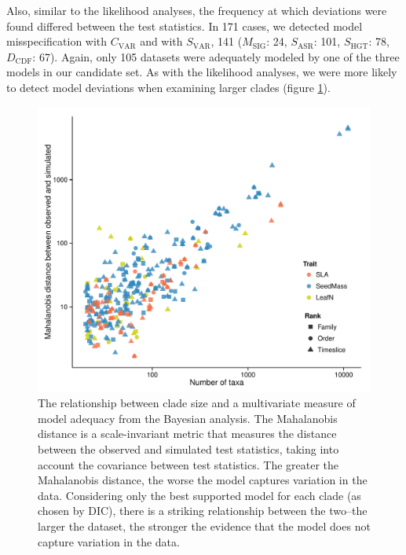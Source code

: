 Also, similar to the likelihood analyses, the frequency at which deviations were found differed between the test statistics. In 171 cases, we detected model misspecification with $C_{\text{VAR}}$ and with $S_{\text{VAR}}$, 141 ($M_{\text{SIG}}$: 24, $S_{\text{ASR}}$: 101, $S_{\text{HGT}}$: 78, $D_{\text{CDF}}$: 67). Again, only 105 datasets were adequately modeled by one of the three models in our candidate set. As with the likelihood analyses, we were more likely to detect model deviations when examining larger clades (figure \ref{fig:supp-size-adequacy}).

\begin{figure}[p]
  \centering
  \includegraphics[width=\textwidth]{figs/ad-size-bayes}
  \caption[Model adequacy vs. clade size (Bayesian)]{The relationship between clade size and a multivariate measure of model adequacy from the Bayesian analysis. The Mahalanobis distance is a scale-invariant metric that measures the distance between the observed and simulated test statistics, taking into account the covariance between test statistics. The greater the Mahalanobis distance, the worse the model captures variation in the data. Considering only the best supported model for each clade (as chosen by DIC), there is a striking relationship between the two--the larger the dataset, the stronger the evidence that the model does not capture variation in the data.}
  \label{fig:supp-size-adequacy}
\end{figure}

